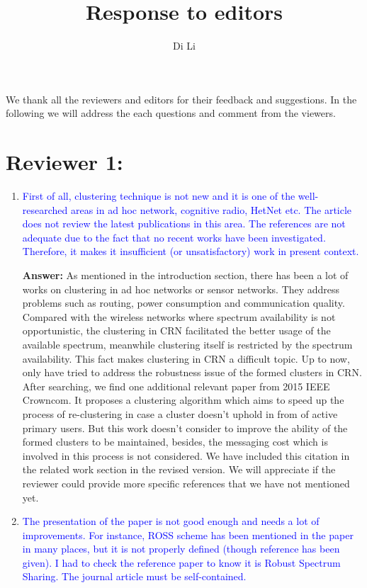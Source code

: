 \documentclass[10pt,a4paper]{article}
\author{Di Li}
\title{Response to editors}
\begin{document}
We thank all the reviewers and editors for their feedback and suggestions.
In the following we will address the each questions and comment from the viewers.

\section{Reviewer 1:}

\begin{enumerate}

\item \textcolor{blue}{  First of all, clustering technique is not new and it is one of the well-researched areas in ad hoc network, cognitive radio, HetNet etc. The article does not review the latest publications in this area. The references are not adequate due to the fact that no recent works have been investigated. Therefore, it makes it insufficient (or unsatisfactory) work in present context.}

\textbf{Answer:} As mentioned in the introduction section, there has been a lot of works on clustering in ad hoc networks or sensor networks.
They address problems such as routing, power consumption and communication quality.
Compared with the wireless networks where spectrum availability is not opportunistic, the clustering in CRN facilitated the better usage of the available spectrum, meanwhile clustering itself is restricted by the spectrum availability.
This fact makes clustering in CRN a difficult topic.
Up to now, only \cite{LIU_TMC11_2, Li11_ROSS, mansoor_15_cluster_robust} have tried to address the robustness issue of the formed clusters in CRN.
After searching, we find one additional relevant paper \cite{Mansoor2015} from 2015 IEEE Crowncom.
It proposes a clustering algorithm which aims to speed up the process of re-clustering in case a cluster doesn't uphold in from of active primary users.
But this work doesn't consider to improve the ability of the formed clusters to be maintained, besides, the messaging cost which is involved in this process is not considered.
We have included this citation in the related work section in the revised version.
We will appreciate if the reviewer could provide more specific references that we have not mentioned yet.

 
\item \textcolor{blue}{  The presentation of the paper is not good enough and needs a lot of improvements. For instance, ROSS scheme has been mentioned in the paper in many places, but it is not properly defined (though reference has been given). I had to check the reference paper to know it is Robust Spectrum Sharing. The journal article must be self-contained.}
    

\end{enumerate}
\end{document}
